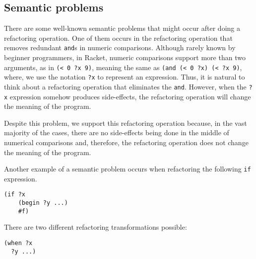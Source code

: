 \subsection{Semantic problems}
There are some well-known semantic problems that might occur after
doing a refactoring operation.  One of them occurs in the refactoring
operation that removes redundant {\tt and}s in numeric comparisons.
Although rarely known by beginner programmers, in Racket, numeric
comparisons support more than two arguments, as in \verb|(< 0 ?x 9)|,
meaning the same as %
\verb|(and (< 0 ?x) (< ?x 9)|, where, we use the notation \verb|?x| to
represent an expression. Thus, it is natural to think about a
refactoring operation that eliminates the \verb|and|.  However, when
the \verb|?x| expression somehow produces side-effects, the
refactoring operation will change the meaning of the program.



Despite this problem, we support this refactoring operation because,
in the vast majority of the cases, there are no side-effects being
done in the middle of numerical comparisons and, therefore, the
refactoring operation does not change the meaning of the program.


Another example of a semantic problem occurs when refactoring the following {\tt if}
expression.
\begin{lstlisting}[basicstyle=\ttfamily, caption=Code sample]
(if ?x
    (begin ?y ...)
    #f)
\end{lstlisting}
There are two different refactoring transformations possible:
\begin{lstlisting}[basicstyle=\ttfamily, caption=Refactoring option 1]
(when ?x
  ?y ...)
\end{lstlisting}

